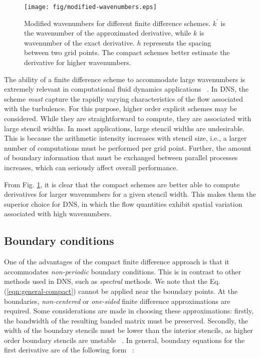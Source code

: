 \begin{figure}
\begin{center}
\texttt{[image: fig/modified-wavenumbers.eps]}
\end{center}
\caption{Modified wavenumbers for different finite difference schemes.
    $k^\prime$ is the wavenumber of the approximated derivative,
    while $k$ is wavenumber of the exact derivative.
    $h$ represents the spacing between two grid points.
    The compact schemes better estimate the derivative
    for higher wavenumbers.}
\label{fig:modified-wavenumbers}
\end{figure}

The ability of a finite difference scheme
to accommodate large wavenumbers
is extremely relevant in
computational fluid dynamics applications
~\cite{KravchenkoEffNumErr}.
In DNS, the scheme
\emph{must} capture the
rapidly varying characteristics of the flow
associated with the turbulence.
For this purpose,
higher order explicit schemes
may be considered.
While they are straightforward to compute,
they are associated with large stencil widths.
In most applications,
large stencil widths are undesirable.
This is because
the arithmetic intensity increases with stencil size, i.e.,
a larger number of computations must be performed per grid point.
Further,
the amount of boundary information that must be exchanged
between parallel processes increases,
which can seriously affect overall performance.

From Fig. \ref{fig:modified-wavenumbers},
it is clear that the compact schemes are better
able to compute derivatives for larger wavenumbers
for a given stencil width.
This makes them the superior choice for DNS,
in which the flow quantities
exhibit spatial variation associated with high wavenumbers.

\subsection{Boundary conditions}

One of the advantages of the compact finite difference approach
is that it accommodates \emph{non-periodic} boundary conditions.
This is in contrast to other methods used in DNS,
such as \emph{spectral} methods.
We note that the Eq. (\ref{eqn:general-compact})
cannot be applied near the boundary points.
At the boundaries,
\emph{non-centered} or \emph{one-sided}
finite difference approximations are required.
Some considerations are made in choosing
these approximations:
firstly, the bandwidth of the resulting banded matrix
must be preserved.
Secondly,
the width of the boundary stencils
must be lower than the interior stencils,
as higher order boundary stencils are unstable
~\cite{kennedy1994several}.
In general, boundary equations for the first derivative
are of the following form ~\cite{lele1992compact}:

